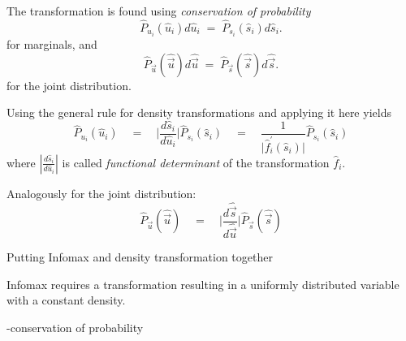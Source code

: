 \begin{frame}{\subsubsecname}


The transformation is found using \emph{conservation of probability}
\begin{equation}
	\widehat{P}_{u_i}(\widehat{u}_i) d \widehat{u}_i 
	\; =  \; \widehat{P}_{s_i} (\widehat{s}_i) d \widehat{s}_i.
\end{equation}
for marginals, and
\begin{equation}
	\widehat{P}_{\vec u}(\widehat{\vec u}) d \widehat{\vec u} 
	\; =  \; \widehat{P}_{\vec s} (\widehat{\vec s}) d \widehat{\vec s}.
\end{equation}
for the joint distribution.


Using the general rule for density transformations and applying it here yields
\begin{equation}
\label{eq:conservation1}
	\widehat{P}_{u_i}(\widehat{u}_i) \quad
	 =  \quad \bigg| 
		\frac{d \widehat{s}_i}{d \widehat{u}_i} \bigg| 
			 \widehat{P}_{s_i}(\widehat{s}_i) \quad
	 =  \quad \frac{1}{\big| \widehat{f}_i^{'} (\widehat{s}_i) \big|} 
		\widehat{P}_{s_i}(\widehat{s}_i)
\end{equation}
where $\left|\frac{d \widehat{s}_i}{d \widehat{u}_i} \right|$ is
called \emph{functional determinant} of the transformation
$\widehat{f}_i$.

Analogously for the joint distribution:
\begin{equation}
\label{eq:conservation1joint}
	\widehat{P}_{\vec u}(\widehat{\vec u}) \quad
	 =  \quad \bigg| 
		\frac{d \widehat{\vec s}}{d \widehat{\vec u}} \bigg| 
			 \widehat{P}_{\vec s}(\widehat{\vec s})
\end{equation}

\end{frame}

\begin{frame}{Putting Infomax and density transformation together}



\pause

Infomax requires a transformation resulting in a uniformly distributed
variable with a constant density.



\pause

-conservation of probability

\end{frame}


